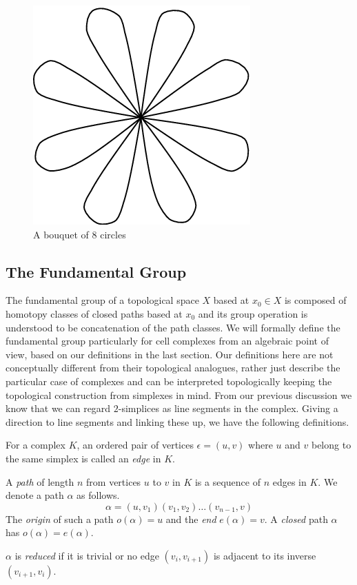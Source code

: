 \begin{figure}
  \centering
  \includegraphics[scale=0.4]{bouquet.png}
  \caption{A bouquet of 8 circles}
  \label{fig:bouquet}
\end{figure}

\subsection{The Fundamental Group}
\label{sec:sc:path}

The fundamental group of a topological space $X$ based at $x_0 \in X$ is composed of homotopy classes of closed paths based at $x_0$ and its group operation is understood to be concatenation of the path classes. We will formally define the fundamental group particularly for cell complexes from an algebraic point of view, based on our definitions in the last section. Our definitions here are not conceptually different from their topological analogues, rather just describe the particular case of complexes and can be interpreted topologically keeping the topological construction from simplexes in mind. From our previous discussion we know that we can regard $2$-simplices as line segments in the complex. Giving a direction to line segments and linking these up, we have the following definitions.

\begin{definition}
  For a complex $K$, an ordered pair of vertices $\epsilon = (u,v)$ where $u$ and $v$ belong to the same simplex is called an \emph{edge} in $K$.
\end{definition}

\begin{definition}
  A \emph{path} of length $n$ from vertices $u$ to $v$ in $K$ is a sequence of $n$ edges in $K$. We denote a path $\alpha$ as follows.
  \[
    \alpha = (u,v_1)(v_1,v_2) \dots (v_{n-1},v)
  \]
  The \emph{origin} of such a path $o(\alpha) = u$ and the \emph{end} $e(\alpha) = v$. A \emph{closed} path $\alpha$ has $o(\alpha) = e(\alpha)$.

  $\alpha$ is \emph{reduced} if it is trivial or no edge $(v_i,v_{i+1})$ is adjacent to its inverse $(v_{i+1},v_i)$.
\end{definition}

